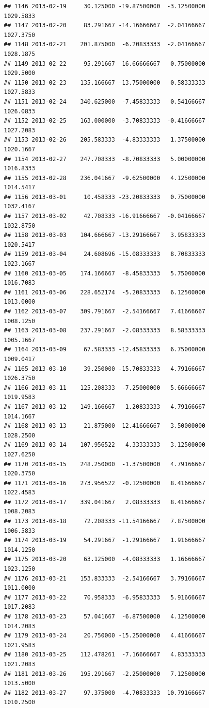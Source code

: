 \documentclass[
]{article}
\begin{document}
\begin{verbatim}
## 1146 2013-02-19     30.125000 -19.87500000  -3.12500000    1029.5833
## 1147 2013-02-20     83.291667 -14.16666667  -2.04166667    1027.3750
## 1148 2013-02-21    201.875000  -6.20833333  -2.04166667    1028.1875
## 1149 2013-02-22     95.291667 -16.66666667   0.75000000    1029.5000
## 1150 2013-02-23    135.166667 -13.75000000   0.58333333    1027.5833
## 1151 2013-02-24    340.625000  -7.45833333   0.54166667    1026.0833
## 1152 2013-02-25    163.000000  -3.70833333  -0.41666667    1027.2083
## 1153 2013-02-26    205.583333  -4.83333333   1.37500000    1020.1667
## 1154 2013-02-27    247.708333  -8.70833333   5.00000000    1016.8333
## 1155 2013-02-28    236.041667  -9.62500000   4.12500000    1014.5417
## 1156 2013-03-01     10.458333 -23.20833333   0.75000000    1032.4167
## 1157 2013-03-02     42.708333 -16.91666667  -0.04166667    1032.8750
## 1158 2013-03-03    104.666667 -13.29166667   3.95833333    1020.5417
## 1159 2013-03-04     24.608696 -15.08333333   8.70833333    1023.1667
## 1160 2013-03-05    174.166667  -8.45833333   5.75000000    1016.7083
## 1161 2013-03-06    228.652174  -5.20833333   6.12500000    1013.0000
## 1162 2013-03-07    309.791667  -2.54166667   7.41666667    1008.1250
## 1163 2013-03-08    237.291667  -2.08333333   8.58333333    1005.1667
## 1164 2013-03-09     67.583333 -12.45833333   6.75000000    1009.0417
## 1165 2013-03-10     39.250000 -15.70833333   4.79166667    1026.3750
## 1166 2013-03-11    125.208333  -7.25000000   5.66666667    1019.9583
## 1167 2013-03-12    149.166667   1.20833333   4.79166667    1014.1667
## 1168 2013-03-13     21.875000 -12.41666667   3.50000000    1028.2500
## 1169 2013-03-14    107.956522  -4.33333333   3.12500000    1027.6250
## 1170 2013-03-15    248.250000  -1.37500000   4.79166667    1020.3750
## 1171 2013-03-16    273.956522  -0.12500000   8.41666667    1022.4583
## 1172 2013-03-17    339.041667   2.08333333   8.41666667    1008.2083
## 1173 2013-03-18     72.208333 -11.54166667   7.87500000    1006.5833
## 1174 2013-03-19     54.291667  -1.29166667   1.91666667    1014.1250
## 1175 2013-03-20     63.125000  -4.08333333   1.16666667    1023.1250
## 1176 2013-03-21    153.833333  -2.54166667   3.79166667    1011.0000
## 1177 2013-03-22     70.958333  -6.95833333   5.91666667    1017.2083
## 1178 2013-03-23     57.041667  -6.87500000   4.12500000    1014.2083
## 1179 2013-03-24     20.750000 -15.25000000   4.41666667    1021.9583
## 1180 2013-03-25    112.478261  -7.16666667   4.83333333    1021.2083
## 1181 2013-03-26    195.291667  -2.25000000   7.12500000    1013.5000
## 1182 2013-03-27     97.375000  -4.70833333  10.79166667    1010.2500

\end{verbatim}
\end{document}
